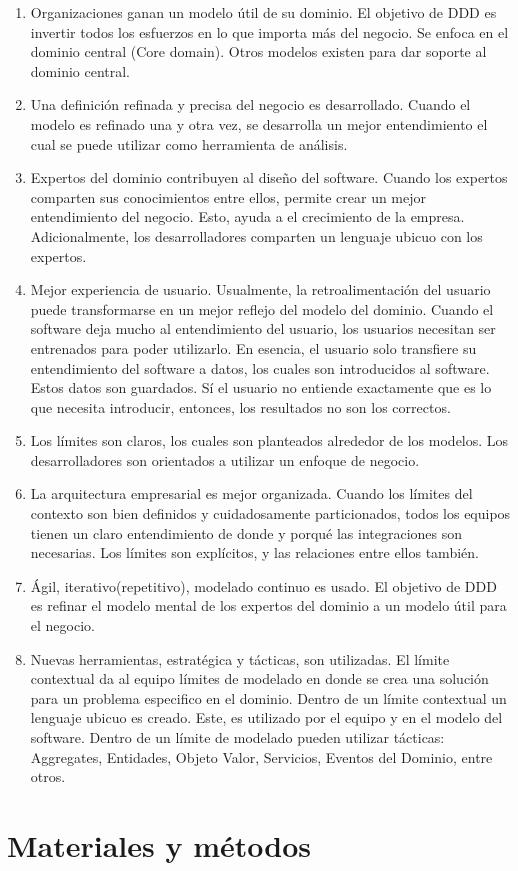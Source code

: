 \documentclass[12pt,twoside]{reedthesis}
\theoremstyle{definition}
\theoremstyle{definition}
\theoremstyle{definition}
\theoremstyle{remark}
\begin{document}
\begin{enumerate}
\def\labelenumi{\arabic{enumi}.}
\item
  Organizaciones ganan un modelo útil de su dominio. El objetivo de DDD
  es invertir todos los esfuerzos en lo que importa más del negocio. Se
  enfoca en el dominio central (Core domain). Otros modelos existen para
  dar soporte al dominio central.
\item
  Una definición refinada y precisa del negocio es desarrollado. Cuando
  el modelo es refinado una y otra vez, se desarrolla un mejor
  entendimiento el cual se puede utilizar como herramienta de análisis.
\item
  Expertos del dominio contribuyen al diseño del software. Cuando los
  expertos comparten sus conocimientos entre ellos, permite crear un
  mejor entendimiento del negocio. Esto, ayuda a el crecimiento de la
  empresa. Adicionalmente, los desarrolladores comparten un lenguaje
  ubicuo con los expertos.
\item
  Mejor experiencia de usuario. Usualmente, la retroalimentación del
  usuario puede transformarse en un mejor reflejo del modelo del
  dominio. Cuando el software deja mucho al entendimiento del usuario,
  los usuarios necesitan ser entrenados para poder utilizarlo. En
  esencia, el usuario solo transfiere su entendimiento del software a
  datos, los cuales son introducidos al software. Estos datos son
  guardados. Sí el usuario no entiende exactamente que es lo que
  necesita introducir, entonces, los resultados no son los correctos.
\item
  Los límites son claros, los cuales son planteados alrededor de los
  modelos. Los desarrolladores son orientados a utilizar un enfoque de
  negocio.
\item
  La arquitectura empresarial es mejor organizada. Cuando los límites
  del contexto son bien definidos y cuidadosamente particionados, todos
  los equipos tienen un claro entendimiento de donde y porqué las
  integraciones son necesarias. Los límites son explícitos, y las
  relaciones entre ellos también.
\item
  Ágil, iterativo(repetitivo), modelado continuo es usado. El objetivo
  de DDD es refinar el modelo mental de los expertos del dominio a un
  modelo útil para el negocio.
\item
  Nuevas herramientas, estratégica y tácticas, son utilizadas. El límite
  contextual da al equipo límites de modelado en donde se crea una
  solución para un problema especifico en el dominio. Dentro de un
  límite contextual un lenguaje ubicuo es creado. Este, es utilizado por
  el equipo y en el modelo del software. Dentro de un límite de modelado
  pueden utilizar tácticas: Aggregates, Entidades, Objeto Valor,
  Servicios, Eventos del Dominio, entre otros.
\end{enumerate}
\hypertarget{materiales-y-metodos}{%
\chapter{Materiales y métodos}\label{materiales-y-metodos}}
\end{document}
